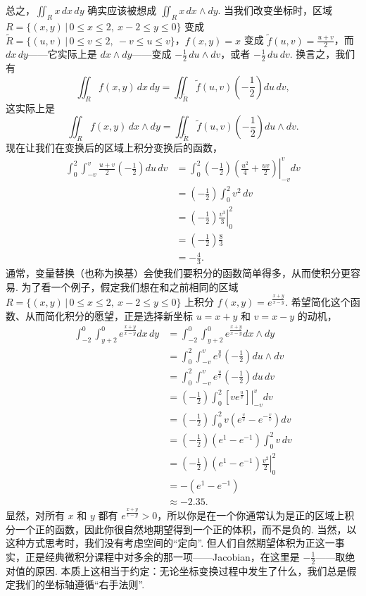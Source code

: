 总之，$\iint_R x\,dx\,dy$ 确实应该被想成 $\iint_R x\,dx\wedge dy$. 当我们改变坐标时，区域 $R=\{(x,y)\,|\,0\leq x\leq 2,\ x-2\leq y\leq 0\}$ 变成 $\widetilde{R}=\{(u,v)\,|\,0\leq v\leq 2,\ -v\leq u\leq v\}$，$f(x,y)=x$ 变成 $\widetilde{f}(u,v)=\frac{u+v}{2}$，而 $dx\,dy$——它实际上是 $dx\wedge dy$——变成 $-\frac{1}{2}\,du\wedge dv$，或者 $-\frac{1}{2}\,du\,dv$. 换言之，我们有
\[
\iint_R f(x,y)\,dx\,dy=\iint_{\widetilde{R}}\widetilde{f}(u,v)\left(-\frac{1}{2}\right)du\,dv,
\]
这实际上是
\[
\iint_R f(x,y)\,dx\wedge dy=\iint_{\widetilde{R}}\widetilde{f}(u,v)\left(-\frac{1}{2}\right)du\wedge dv.
\]
现在让我们在变换后的区域上积分变换后的函数，
\begin{align*}
\int_0^2\int_{-v}^{v}\frac{u+v}{2}\left(-\frac{1}{2}\right)du\,dv
&=\int_0^2\left.\left(-\frac{1}{2}\right)\left(\frac{u^2}{4}+\frac{uv}{2}\right)\right|_{-v}^{v}dv\\
&=\left(-\frac{1}{2}\right)\int_0^2 v^2\,dv\\
&=\left(-\frac{1}{2}\right)\left.\frac{v^3}{3}\right|_0^2\\
&=\left(-\frac{1}{2}\right)\frac{8}{3}\\
&=-\frac{4}{3}.
\end{align*}
通常，变量替换（也称为换基）会使我们要积分的函数简单得多，从而使积分更容易. 为了看一个例子，假定我们想在和之前相同的区域 $R=\{(x,y)\,|\,0\leq x\leq 2,\ x-2\leq y\leq 0\}$ 上积分 $f(x,y)=e^{\frac{x+y}{x-y}}$. 希望简化这个函数、从而简化积分的愿望，正是选择新坐标 $u=x+y$ 和 $v=x-y$ 的动机，
\begin{align*}
\int_{-2}^{0}\int_{y+2}^{0}e^{\frac{x+y}{x-y}}dx\,dy
&=\int_{-2}^{0}\int_{y+2}^{0}e^{\frac{x+y}{x-y}}dx\wedge dy\\
&=\int_0^2\int_{-v}^{v}e^{\frac{u}{v}}\left(-\frac{1}{2}\right)du\wedge dv\\
&=\int_0^2\int_{-v}^{v}e^{\frac{u}{v}}\left(-\frac{1}{2}\right)du\,dv\\
&=\left(-\frac{1}{2}\right)\int_0^2\left.\left[ve^{\frac{u}{v}}\right]\right|_{-v}^{v}dv\\
&=\left(-\frac{1}{2}\right)\int_0^2 v\left(e^{\frac{v}{v}}-e^{-\frac{v}{v}}\right)dv\\
&=\left(-\frac{1}{2}\right)\left(e^1-e^{-1}\right)\int_0^2 v\,dv\\
&=\left(-\frac{1}{2}\right)\left(e^1-e^{-1}\right)\left.\frac{v^2}{2}\right|_0^2\\
&=-\left(e^1-e^{-1}\right)\\
&\approx-2.35.
\end{align*}
显然，对所有 $x$ 和 $y$ 都有 $e^{\frac{x+y}{x-y}}>0$，所以你是在一个你通常认为是正的区域上积分一个正的函数，因此你很自然地期望得到一个正的体积，而不是负的. 当然，以这种方式思考时，我们没有考虑空间的``定向''. 但人们自然期望体积为正这一事实，正是经典微积分课程中对多余的那一项——Jacobian，在这里是 $-\frac{1}{2}$——取绝对值的原因. 本质上这相当于约定：无论坐标变换过程中发生了什么，我们总是假定我们的坐标轴遵循``右手法则''.

